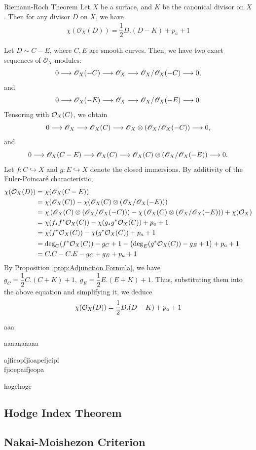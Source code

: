 \documentclass[a4paper, eqnumbering=section, thmnumbering=section, 10pt]{simple-eng}
\begin{document}
\begin{theorem}{Riemann-Roch Theorem}{}
    Let $X$ be a surface, and $K$ be the canonical divisor on $X$. 
    Then for any divisor $D$ on $X$, we have
    \begin{align}
        \chi(\mathscr{O}_X(D)) = \dfrac{1}{2}D.(D-K) + p_a + 1
    \end{align}
\end{theorem}
\begin{myproof}
    Let $D\sim C-E$, where $C,E$ are smooth curves. Then, we have two exact sequences of 
    $\mathscr{O}_X$-modules:
    \[0 \longrightarrow \mathscr{O}_X(-C)\longrightarrow \mathscr{O}_X \longrightarrow \mathscr{O}_X/\mathscr{O}_X(-C) \longrightarrow 0, \] and
    \[ 0 \longrightarrow \mathscr{O}_X(-E)\longrightarrow \mathscr{O}_X \longrightarrow \mathscr{O}_X/\mathscr{O}_X(-E) \longrightarrow 0. \]
    Tensoring with $\mathcal{O}_X(C)$, we obtain
    \[
        0 \longrightarrow \mathscr{O}_X \longrightarrow \mathscr{O}_X(C) \longrightarrow \mathscr{O}_X\otimes (\mathscr{O}_X/\mathscr{O}_X(-C)) \longrightarrow 0,
    \]
    and
    \[
        0 \longrightarrow \mathscr{O}_X(C-E) \longrightarrow \mathscr{O}_X(C) \longrightarrow \mathscr{O}_X(C)\otimes (\mathscr{O}_X/\mathscr{O}_X(-E))\longrightarrow 0.
    \]
    Let $f:C \hookrightarrow X$ and $g:E\hookrightarrow X$ denote the closed immersions. By 
    additivity of the Euler-Poincaré characteristic, 
    \setlength{\jot}{10pt} 
    \begin{align}
        \chi(\mathcal{O}_X(D)) &= \chi(\mathscr{O}_X(C-E)) \\ 
        &= \chi(\mathscr{O}_X(C)) - 
        \chi(\mathscr{O}_X(C)\otimes(\mathscr{O}_X/\mathscr{O}_X(-E)))\\
        &=  \chi\left(\mathscr{O}_X(C)\otimes (\mathscr{O}_X/\mathscr{O}_X(-C))\right)
        - \chi\left( \mathscr{O}_X(C)\otimes(\mathscr{O}_X/\mathscr{O}_X(-E)) \right)
        + \chi(\mathcal{O}_X)\\
        &= \chi(f_\ast f^\ast \mathcal{O}_X(C)) - \chi(g_\ast g^\ast \mathcal{O}_X(C)) + p_a + 1\\
        &= \chi(f^\ast \mathcal{O}_X(C)) - \chi(g^\ast\mathcal{O}_X(C)) + p_a + 1\\
        &= \deg_C(f^\ast \mathcal{O}_X(C)) - g_C + 1 - \bigl( \deg_E(g^\ast\mathcal{O}_X(C)) - g_E + 1\bigr) + p_a + 1\\
        &= C.C - C.E - g_C + g_E + p_a + 1
    \end{align}By Proposition \ref{prop:Adjunction Formula}, we have
    $g_C = \dfrac{1}{2}C.(C+K) + 1, \;g_E = \dfrac{1}{2}E.(E+K) + 1$.
    Thus, substituting them into the above equation and simplifying it, we deduce 
    \begin{align}
        \chi(\mathcal{O}_X(D)) = \dfrac{1}{2}D.(D-K) + p_a + 1
    \end{align}\hfill
\end{myproof}

\newpage
aaa
\begin{myproof}
    aaaaaaaaaa
\end{myproof}ajfieopfjioapefjeipi\\fjioepaifjeopa
\begin{definition}{}{}
    hogehoge
\end{definition}



\subsection*{Hodge Index Theorem}

\subsection*{Nakai-Moishezon Criterion}
\end{document}
